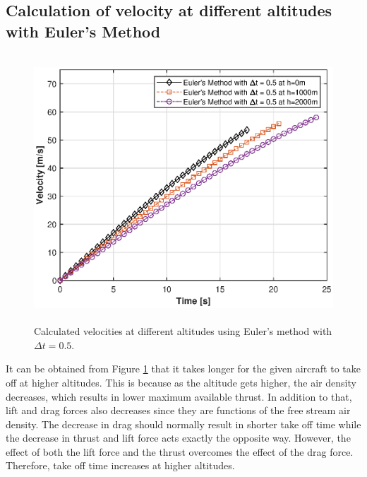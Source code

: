 \documentclass[letterpaper,12pt]{article}
\begin{document}
\subsection{Calculation of velocity at different altitudes with Euler's Method }
\begin{figure}[ht]
        \centering \includegraphics[max height=10cm]{graphs/altitude.eps}
        \caption{Calculated velocities at different altitudes using Euler's method with $\Delta t = 0.5$.}
        \label{fig:altitude}
\end{figure}

It can be obtained from Figure \ref{fig:altitude} that it takes longer for the given aircraft to take off at higher altitudes. 
This is because as the altitude gets higher, the air density decreases, which results in lower maximum available
thrust. In addition to that, lift and drag forces also decreases since they are functions of the free stream
air density. The decrease in drag should normally result in shorter take off time while the decrease in thrust and lift force acts exactly the opposite way. However, 
the effect of both the lift force and the thrust overcomes the effect of the drag force. Therefore, take off time increases at higher altitudes.
\newpage
\end{document}
